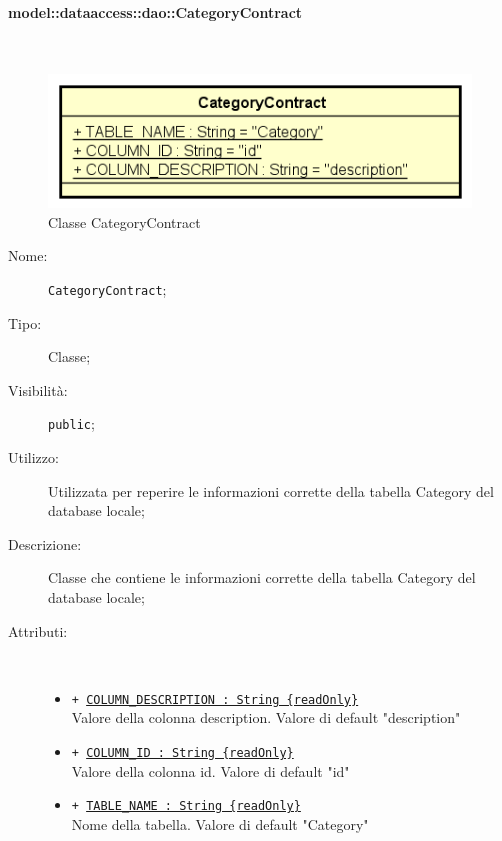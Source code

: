 \documentclass[../DefinizioneDiProdotto.tex]{subfiles}
\begin{document}
\paragraph{model::dataaccess::dao::CategoryContract}
\
\begin{figure}[H]
	\centering
	\includegraphics[width=\maxwidth]{img/CategoryContract.png}
	\caption{Classe CategoryContract}\label{fig:model::dataaccess::dao::CategoryContract} 
\end{figure}
\begin{description}
	\item[Nome:] \texttt{CategoryContract};
	\item[Tipo:] Classe;
	\item[Visibilità:] \texttt{public};
	\item[Utilizzo:] Utilizzata per reperire le informazioni corrette della tabella Category del database locale;
	\item[Descrizione:] Classe che contiene le informazioni corrette della tabella Category del database locale;
	\item[Attributi:] \
	\begin{itemize}
		\item \texttt{+ \underline{COLUMN\_DESCRIPTION : String \{readOnly\}}}\\
		Valore della colonna description. Valore di default "description"
		
		\item \texttt{+ \underline{COLUMN\_ID : String \{readOnly\}}}\\
		Valore della colonna id. Valore di default "id"
		
		\item \texttt{+ \underline{TABLE\_NAME : String \{readOnly\}}}\\
		Nome della tabella. Valore di default "Category"
		
	\end{itemize}
\end{description}
\end{document}
